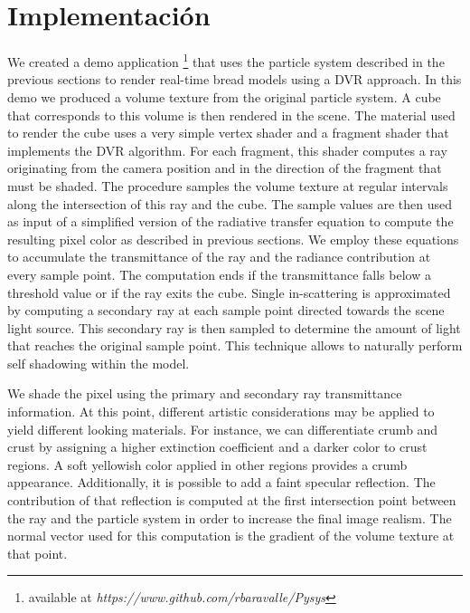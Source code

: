 
\section{Implementación}


We created a demo application \footnote{available at \emph{https://www.github.com/rbaravalle/Pysys}} that uses the particle system described in the previous sections to render real-time bread models using a DVR approach. 
In this demo we produced a volume texture from the original particle system.
A cube that corresponds to this volume is then rendered in the scene.
The material used to render the cube uses a very simple vertex shader and a fragment shader that implements the DVR algorithm. For each fragment, this shader computes a ray originating from the camera position and in the direction of the fragment that must be shaded. 
The procedure samples the volume texture at regular intervals along the intersection of this ray and the cube.
The sample values are then used as input of a simplified version of the radiative transfer equation to compute the resulting pixel color as described in previous sections.
We employ these equations to accumulate the transmittance of the ray and the radiance contribution at every sample point.
The computation ends if the transmittance falls below a threshold value or if the ray exits the cube. 
Single in-scattering is approximated by computing a secondary ray at each sample point directed towards the scene light source.
This secondary ray is then sampled to determine the amount of light that reaches the original sample point. 
This technique allows to naturally perform self shadowing within the model.

We shade the pixel using the primary and secondary ray transmittance information. 
At this point, different artistic considerations may be applied to yield different
looking materials.
For instance, we can differentiate crumb and crust by assigning a higher extinction coefficient and a darker color to crust regions. 
A soft yellowish color applied in other regions provides a crumb appearance.
Additionally, it is possible to add a faint specular reflection. 
The contribution of that reflection is computed at the first intersection point between the ray and the particle system in order to increase the final image realism. 
The normal vector used for this computation is the gradient of the volume texture at that point.

